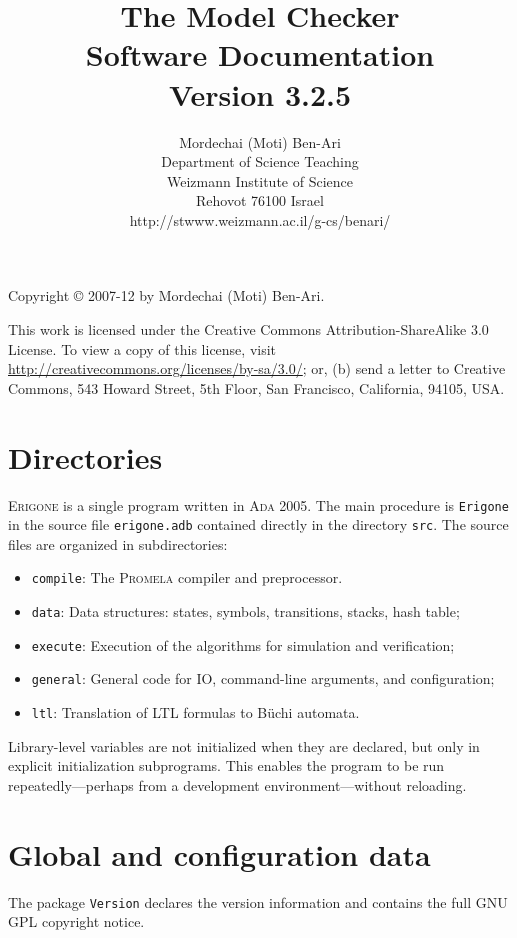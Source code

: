 \documentclass[11pt]{article}
\title{The \prg{} Model Checker\\\bigskip%
Software Documentation\\\bigskip%
\large Version 3.2.5\\\bigskip}     %
\author{Mordechai (Moti) Ben-Ari\\
Department of Science Teaching\\
Weizmann Institute of Science\\
Rehovot 76100 Israel\\
\textsf{http://stwww.weizmann.ac.il/g-cs/benari/}}
\newcommand*{\prg}{\textsc{Erigone}}
\newcommand*{\prm}{\textsc{Promela}}
\newcommand*{\ada}{\textsc{Ada 2005}}
\newcommand*{\p}[1]{\texttt{#1}}
\begin{document}
\maketitle
\thispagestyle{empty}

\vfill

\begin{center}
Copyright \copyright{} 2007-12 by Mordechai (Moti) Ben-Ari.
\end{center}
This work is licensed under the Creative Commons Attribution-ShareAlike 3.0
License. To view a copy of this license, visit
\url{http://creativecommons.org/licenses/by-sa/3.0/}; or, (b) send a letter
to Creative Commons, 543 Howard Street, 5th Floor, San Francisco,
California, 94105, USA.

\newpage

\section{Directories}
\prg{} is a single program written in \ada{}. The main procedure is
\p{Erigone} in the source file \p{erigone.adb} contained directly in the
directory \p{src}. The source files are organized in subdirectories:
\begin{itemize}
\item \p{compile}: The \prm{} compiler and preprocessor.
\item \p{data}: Data structures: states, symbols, transitions, stacks, hash
table;
\item \p{execute}: Execution of the algorithms for simulation and
verification;
\item \p{general}: General code for IO, command-line arguments,
and configuration;
\item \p{ltl}: Translation of LTL formulas to B\"{u}chi automata.
\end{itemize}

Library-level variables are not initialized when they are declared, but
only in explicit initialization subprograms. This enables the program
to be run repeatedly---perhaps from a development environment---without
reloading.

\section{Global and configuration data}

The package \p{Version} declares the version information and contains
the full GNU GPL copyright notice.
\end{document}

